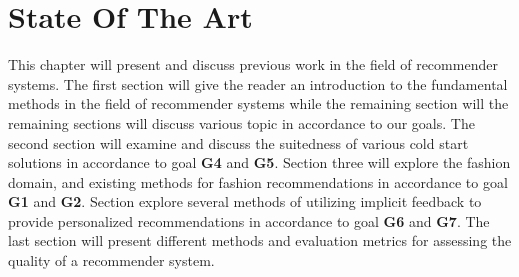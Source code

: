 
\chapter{State Of The Art}
\minitoc
\label{chap:SotA}

This chapter will present and discuss previous work in the field of recommender
systems. The first section will give the reader an introduction to the fundamental
methods in the field of recommender systems while the remaining section will the remaining
sections will discuss various topic in accordance to our goals. The second section will
examine and discuss the suitedness of various cold start solutions in accordance to
goal \textbf{G4} and \textbf{G5}. Section three will explore the fashion domain, and 
existing methods for fashion recommendations in accordance to goal \textbf{G1} and 
\textbf{G2}. Section explore several methods of utilizing implicit feedback to provide
personalized recommendations in accordance to goal \textbf{G6} and \textbf{G7}.
The last section will present different methods and evaluation metrics for assessing
the quality of a recommender system.

\restoregeometry

\clearpage






